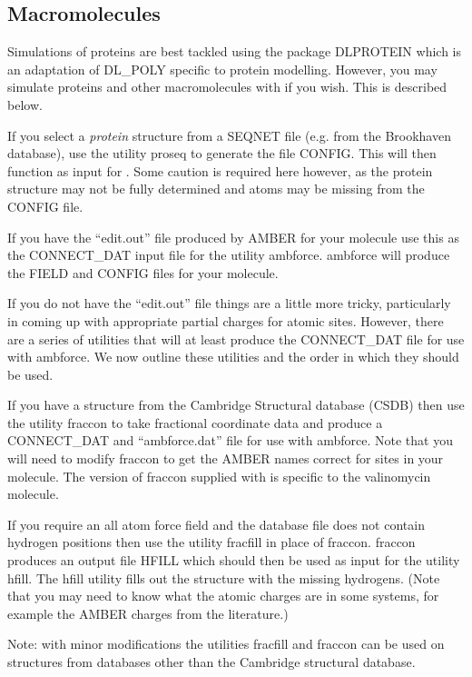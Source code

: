 \subsection{Macromolecules}

Simulations of proteins are best tackled using the package
DLPROTEIN \cite{dlprotein} which is an adaptation
of DL\_POLY specific to protein modelling.  However, you may
simulate proteins and other macromolecules with \D if you wish.
This is described below.

If you select a {\em protein} structure from a SEQNET file (e.g.
from the Brookhaven database), use the utility {\sc proseq} to
generate the file CONFIG.  This will then function as input for
\D.  Some caution is required here however, as the protein
structure may not be fully determined and atoms may be missing
from the CONFIG file.

If you have the ``edit.out'' file produced by AMBER
for your molecule use this as the CONNECT\_DAT input file for the
utility {\sc ambforce}.  {\sc ambforce} will produce the \D FIELD
and CONFIG files for your molecule.

If you do not have the ``edit.out'' file things are a little more
tricky, particularly in coming up with appropriate partial charges
for atomic sites.  However, there are a series of utilities that
will at least produce the CONNECT\_DAT file for use with {\sc
ambforce}.  We now outline these utilities and the order in which
they should be used.

If you have a structure from the Cambridge Structural database
(CSDB) then use the utility {\sc fraccon} to take fractional
coordinate data and produce a CONNECT\_DAT and ``ambforce.dat''
file for use with {\sc ambforce}.  Note that you will need to
modify {\sc fraccon} to get the AMBER names correct
for sites in your molecule.  The version of {\sc fraccon} supplied
with \D is specific to the valinomycin molecule.

If you require an all atom force field and the database file does
not contain hydrogen positions then use the utility {\sc fracfill}
in place of {\sc fraccon}.  {\sc fraccon} produces an output file
HFILL which should then be used as input for the utility {\sc
hfill}.  The {\sc hfill} utility fills out the structure with the
missing hydrogens.  (Note that you may need to know what the
atomic charges are in some systems, for example the AMBER charges
from the literature.)

Note: with minor modifications the utilities {\sc fracfill} and {\sc
fraccon} can be used on structures from databases other than the
Cambridge structural database.


